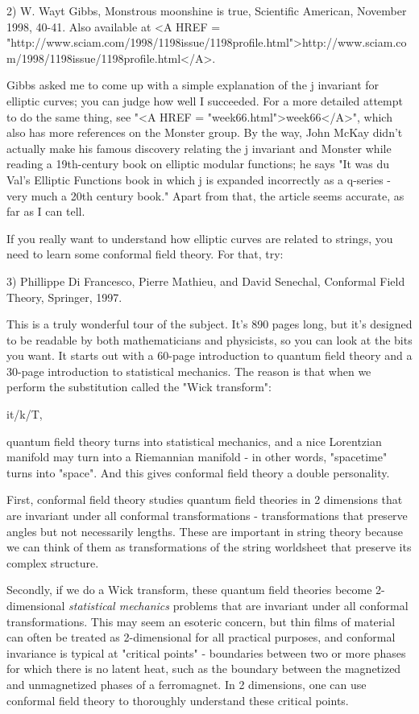 2) W. Wayt Gibbs, Monstrous moonshine is true, Scientific American, November
1998, 40-41.  Also available at <A HREF = "http://www.sciam.com/1998/1198issue/1198profile.html">http://www.sciam.com/1998/1198issue/1198profile.html</A>.

Gibbs asked me to come up with a simple explanation of the j invariant
for elliptic curves; you can judge how well I succeeded.  For a more
detailed attempt to do the same thing, see "<A HREF = "week66.html">week66</A>", which also has more
references on the Monster group.  By the way, John McKay didn't actually
make his famous discovery relating the j invariant and Monster while
reading a 19th-century book on elliptic modular functions; he says
"It was du Val's Elliptic Functions book in which j is expanded 
incorrectly as a q-series - very much a 20th century book."  Apart from
that, the article seems accurate, as far as I can tell.

If you really want to understand how elliptic curves are related to strings, 
you need to learn some conformal field theory.   For that, try:

3) Phillippe Di Francesco, Pierre Mathieu, and David Senechal, Conformal
Field Theory, Springer, 1997.

This is a truly wonderful tour of the subject.   It's 890 pages long, but
it's designed to be readable by both mathematicians and physicists, so
you can look at the bits you want.  It starts out with a 60-page
introduction to quantum field theory and a 30-page introduction to 
statistical mechanics.  The reason is that when we perform the 
substitution called the "Wick transform":

                       it/\hbar  \to  k/T,

quantum field theory turns into statistical mechanics, and a nice
Lorentzian manifold may turn into a Riemannian manifold - in other
words, "spacetime" turns into "space".  And 
this gives conformal field theory a double personality.  

First, conformal field theory studies quantum field theories in 2
dimensions that are invariant under all conformal transformations -
transformations that preserve angles but not necessarily lengths.  These
are important in string theory because we can think of them as
transformations of the string worldsheet that preserve its complex
structure.   

Secondly, if we do a Wick transform, these quantum field theories become
2-dimensional \emph{statistical mechanics} problems that are invariant under
all conformal transformations.  This may seem an esoteric concern, but
thin films of material can often be treated as 2-dimensional for all
practical purposes, and conformal invariance is typical at "critical
points" - boundaries between two or more phases for which there is no
latent heat, such as the boundary between the magnetized and
unmagnetized phases of a ferromagnet.  In 2 dimensions, one can use
conformal field theory to thoroughly understand these critical points.  

